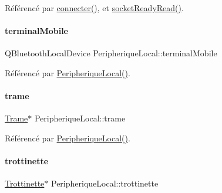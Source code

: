 Référencé par \hyperlink{class_peripherique_local_af2e7f023f8ed72ebc1d36e66c440ceca}{connecter()}, et \hyperlink{class_peripherique_local_a48840475209b5cabcf60e3176de63b92}{socket\+Ready\+Read()}.

\mbox{\label{class_peripherique_local_a515044c46ba91db8d0b29362226860aa}} 
\paragraph{\texorpdfstring{terminal\+Mobile}{terminalMobile}}
{\footnotesize\ttfamily Q\+Bluetooth\+Local\+Device Peripherique\+Local\+::terminal\+Mobile\hspace{0.3cm}{\ttfamily [private]}}



Référencé par \hyperlink{class_peripherique_local_a99a652b8659a3692f164cf1a0382e4bf}{Peripherique\+Local()}.

\mbox{\label{class_peripherique_local_a3c96dbda4eacf235c2bb0cabaa742122}} 
\paragraph{\texorpdfstring{trame}{trame}}
{\footnotesize\ttfamily \hyperlink{class_trame}{Trame}$\ast$ Peripherique\+Local\+::trame\hspace{0.3cm}{\ttfamily [private]}}



Référencé par \hyperlink{class_peripherique_local_a99a652b8659a3692f164cf1a0382e4bf}{Peripherique\+Local()}.

\mbox{\label{class_peripherique_local_aa110b2c3292270553f592362e45f710b}} 
\paragraph{\texorpdfstring{trottinette}{trottinette}}
{\footnotesize\ttfamily \hyperlink{class_trottinette}{Trottinette}$\ast$ Peripherique\+Local\+::trottinette\hspace{0.3cm}{\ttfamily [private]}}



